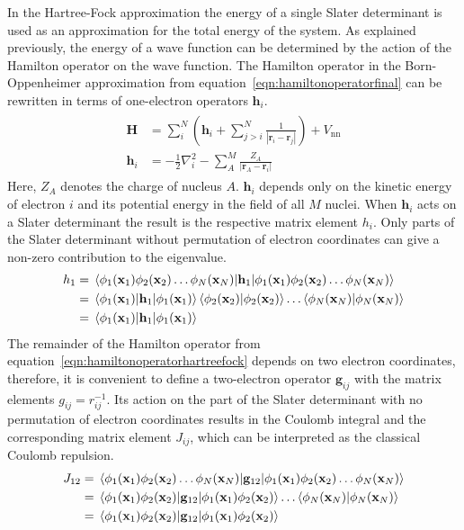 In the Hartree-Fock approximation the energy of a single Slater determinant is
used as an approximation for the total energy of the system. As explained
previously, the energy of a wave function can be determined by the action of
the Hamilton operator on the wave function. The Hamilton operator in the
Born-Oppenheimer approximation from equation~\eqref{eqn:hamiltonoperatorfinal}
can be rewritten in terms of one-electron operators $\mathbf{h}_i$.
%
\begin{align}
\begin{aligned}
    \mathbf{H}&=\sum_i^N\left(\mathbf{h}_i + \sum_{j>i}^N\frac{1}{|\mathbf{r}_i-\mathbf{r}_j|}\right) + V_\text{nn} \\
    \mathbf{h}_i&=-\frac{1}{2}\nabla_i^2-\sum_A^M\frac{Z_A}{|\mathbf{r}_A-\mathbf{r}_i|}\label{eqn:hamiltonoperatorhartreefock}
\end{aligned}
\end{align}
%
Here, $Z_A$ denotes the charge of nucleus $A$. $\mathbf{h}_i$ depends only on
the kinetic energy of electron $i$ and its potential energy in the field of all
$M$ nuclei. When $\mathbf{h}_i$ acts on a Slater determinant the result is the
respective matrix element $h_i$. Only parts of the Slater determinant without
permutation of electron coordinates can give a non-zero contribution to the
eigenvalue.
%
\begin{align}
    \begin{aligned}
        h_1&=\mel{\phi_1(\mathbf{x}_1)\phi_2(\mathbf{x}_2)\ldots\phi_N(\mathbf{x}_N)}{\mathbf{h}_1}{\phi_1(\mathbf{x}_1)\phi_2(\mathbf{x}_2)\ldots\phi_N(\mathbf{x}_N)}\\
        &=\mel{\phi_1(\mathbf{x}_1)}{\mathbf{h}_1}{\phi_1(\mathbf{x}_1)}\braket{\phi_2(\mathbf{x}_2)}\ldots\braket{\phi_N(\mathbf{x}_N)} \\
        &=\mel{\phi_1(\mathbf{x}_1)}{\mathbf{h}_1}{\phi_1(\mathbf{x}_1)}
    \end{aligned}
\end{align}
%
The remainder of the Hamilton operator from
equation~\eqref{eqn:hamiltonoperatorhartreefock} depends on two electron
coordinates, therefore, it is convenient to define a two-electron operator
$\mathbf{g}_{ij}$ with the matrix elements
$g_{ij}=r_{ij}^{-1}
$. Its action on the part of the
Slater determinant with no permutation of electron coordinates results in the
Coulomb integral and the corresponding matrix element $J_{ij}$, which can be
interpreted as the classical Coulomb repulsion.
%
\begin{align}
    \begin{aligned}
        J_{12}&=\mel{\phi_1(\mathbf{x}_1)\phi_2(\mathbf{x}_2)\ldots\phi_N(\mathbf{x}_N)}{\mathbf{g}_{12}}{\phi_1(\mathbf{x}_1)\phi_2(\mathbf{x}_2)\ldots\phi_N(\mathbf{x}_N)}\\
        &=\mel{\phi_1(\mathbf{x}_1)\phi_2(\mathbf{x}_2)}{\mathbf{g}_{12}}{\phi_1(\mathbf{x}_1)\phi_2(\mathbf{x}_2)}\ldots\braket{\phi_N(\mathbf{x}_N)} \\
        &=\mel{\phi_1(\mathbf{x}_1)\phi_2(\mathbf{x}_2)}{\mathbf{g}_{12}}{\phi_1(\mathbf{x}_1)\phi_2(\mathbf{x}_2)}
    \end{aligned}
\end{align}
